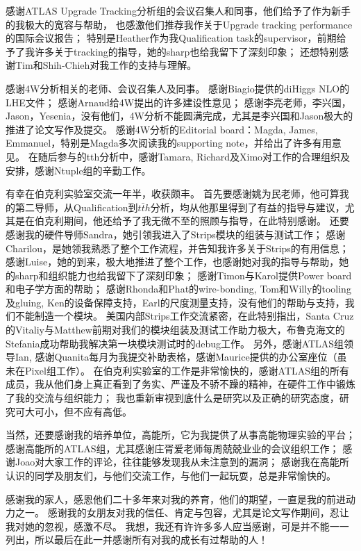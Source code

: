 感谢ATLAS Upgrade Tracking分析组的会议召集人和同事，他们给予了作为新手的我极大的宽容与帮助，
也感激他们推荐我作关于Upgrade tracking performance的国际会议报告；
特别是Heather作为我Qualification task的supervisor，前期给予了我许多关于tracking的指导，她的sharp也给我留下了深刻印象；
还想特别感谢Tim和Shih-Chieh对我工作的支持与理解。

感谢4W分析相关的老师、会议召集人及同事。
感谢Biagio提供的diHiggs NLO的LHE文件；
感谢Arnaud给4W提出的许多建设性意见；
感谢李亮老师，李兴国，Jason，Yesenia，没有他们，4W分析不能圆满完成，尤其是李兴国和Jason极大的推进了论文写作及提交。
感谢4W分析的Editorial board：Magda, James, Emmanuel，特别是Magda多次阅读我的supporting note，并给出了许多有用意见。
在随后参与的tth分析中，感谢Tamara, Richard及Ximo对工作的合理组织及安排，感谢Ntuple组的辛勤工作。

有幸在伯克利实验室交流一年半，收获颇丰。
首先要感谢姚为民老师，他可算我的第二导师，从Qualification到$t\bar{t}h$分析，均从他那里得到了有益的指导与建议，尤其是在伯克利期间，他还给予了我无微不至的照顾与指导，在此特别感谢。
还要感谢我的硬件导师Sandra，她引领我进入了Strips模块的组装与测试工作；
感谢Charilou，是她领我熟悉了整个工作流程，并告知我许多关于Strips的有用信息；
感谢Luise，她的到来，极大地推进了整个工作，也感谢她对我的指导与帮助，她的sharp和组织能力也给我留下了深刻印象；
感谢Timon与Karol提供Power board和电子学方面的帮助；
感谢Rhonda和Phat的wire-bonding, Tom和Willy的tooling及gluing, Ken的设备保障支持，Earl的尺度测量支持，没有他们的帮助与支持，我们不能制造一个模块。
美国内部Strips工作交流紧密，在此特别指出，Santa Cruz的Vitaliy与Matthew前期对我们的模块组装及测试工作助力极大，布鲁克海文的Stefania成功帮助我解决第一块模块测试时的debug工作。
另外，感谢ATLAS组领导Ian, 感谢Quanita每月为我提交补助表格，感谢Maurice提供的办公室座位（虽未在Pixel组工作）。
在伯克利实验室的工作是非常愉快的，感谢ATLAS组的所有成员，我从他们身上真正看到了务实、严谨及不骄不躁的精神，在硬件工作中锻炼了我的交流与组织能力；
我也重新审视到底什么是研究以及正确的研究态度，研究可大可小，但不应有高低。

当然，还要感谢我的培养单位，高能所，它为我提供了从事高能物理实验的平台；
感谢高能所的ATLAS组，尤其感谢庄胥爱老师每周兢兢业业的会议组织工作；
感谢Joao对大家工作的评论，往往能够发现我从未注意到的漏洞；
感谢我在高能所认识的同学及朋友们，与他们交流工作，与他们一起玩耍，总是非常愉快的。

感谢我的家人，感恩他们二十多年来对我的养育，他们的期望，一直是我的前进动力之一。
感谢我的女朋友对我的信任、肯定与包容，尤其是论文写作期间，忍让我对她的忽视，感激不尽。
我想，我还有许许多多人应当感谢，可是并不能一一列出，所以最后在此一并感谢所有对我的成长有过帮助的人！

\cleardoublepage[plain]%

